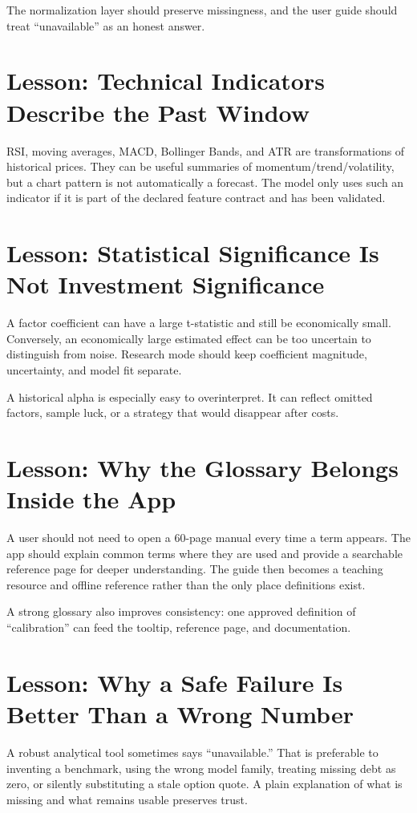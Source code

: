 \documentclass[11pt]{article}
\begin{document}
The normalization layer should preserve missingness, and the user guide should treat ``unavailable'' as an honest answer.

\section{Lesson: Technical Indicators Describe the Past Window}
RSI, moving averages, MACD, Bollinger Bands, and ATR are transformations of historical prices. They can be useful summaries of momentum/trend/volatility, but a chart pattern is not automatically a forecast. The model only uses such an indicator if it is part of the declared feature contract and has been validated.

\section{Lesson: Statistical Significance Is Not Investment Significance}
A factor coefficient can have a large t-statistic and still be economically small. Conversely, an economically large estimated effect can be too uncertain to distinguish from noise. Research mode should keep coefficient magnitude, uncertainty, and model fit separate.

A historical alpha is especially easy to overinterpret. It can reflect omitted factors, sample luck, or a strategy that would disappear after costs.

\section{Lesson: Why the Glossary Belongs Inside the App}
A user should not need to open a 60-page manual every time a term appears. The app should explain common terms where they are used and provide a searchable reference page for deeper understanding. The guide then becomes a teaching resource and offline reference rather than the only place definitions exist.

A strong glossary also improves consistency: one approved definition of ``calibration'' can feed the tooltip, reference page, and documentation.

\section{Lesson: Why a Safe Failure Is Better Than a Wrong Number}
A robust analytical tool sometimes says ``unavailable.'' That is preferable to inventing a benchmark, using the wrong model family, treating missing debt as zero, or silently substituting a stale option quote. A plain explanation of what is missing and what remains usable preserves trust.
\end{document}
